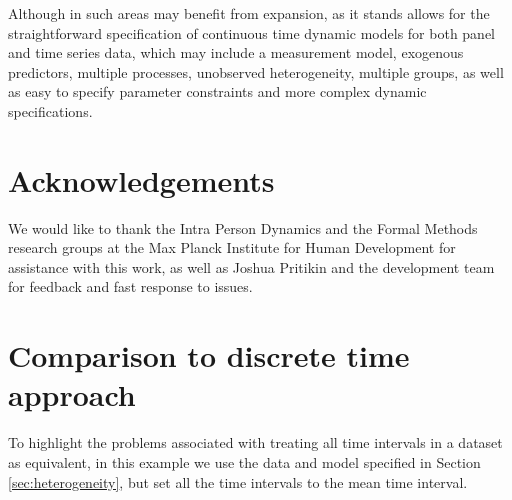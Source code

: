 \documentclass[nojss]{jss}\usepackage[]{graphicx}\usepackage[]{color}
\begin{document}
Although in such areas  may benefit from expansion,  as it stands allows for the straightforward specification of continuous time dynamic models for both panel and time series data, which may include a measurement model, exogenous predictors, multiple processes, unobserved heterogeneity, multiple groups, as well as easy to specify parameter constraints and more complex dynamic specifications. 

\section[Acknowledgements]{Acknowledgements}\nopagebreak
We would like to thank the Intra Person Dynamics and the Formal Methods research groups at the Max Planck Institute for Human Development for assistance with this work, as well as Joshua Pritikin and the  development team for feedback and fast response to issues.


\newpage
\appendix
\section{Comparison to discrete time approach}\label{appendix:discretecomparison}\nopagebreak
To highlight the problems associated with treating all time intervals in a dataset as equivalent, in this example we use the data and model specified in Section \ref{sec:heterogeneity}, but set all the time intervals to the mean time interval. 
\end{document}
